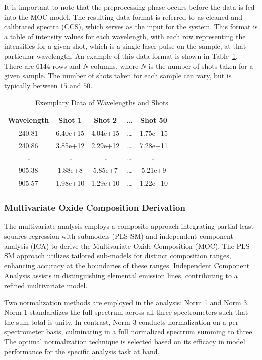 It is important to note that the preprocessing phase occurs before the data is fed into the MOC model.
The resulting data format is referred to as cleaned and calibrated spectra (CCS), which serves as the input for the system.
This format is a table of intensity values for each wavelength, with each row representing the intensities for a given shot, which is a single laser pulse on the sample, at that particular wavelength. An example of this data format is shown in Table~\ref{tab:example_data}. There are $6144$ rows and $N$ columns, where $N$ is the number of shots taken for a given sample. The number of shots taken for each sample can vary, but is typically between $15$ and $50$.

\begin{table}[ht]
\centering
\caption{Exemplary Data of Wavelengths and Shots}
\label{tab:example_data}
\begin{tabular}{|c|c|c|c|c|c|c|c|c|}
\hline
Wavelength & Shot 1   & Shot 2 & \ldots & Shot 50  \\ \hline
240.81     & 6.40e+15 & 4.04e+15 & \ldots& 1.75e+15 \\ \hline
240.86     & 3.85e+12 & 2.29e+12& \ldots & 7.28e+11 \\ \hline
\ldots     & \ldots & \ldots & \ldots & \ldots \\ \hline
905.38     & 1.88e+8 & 5.85e+7 & \ldots & 5.21e+9 \\ \hline
905.57     & 1.98e+10 & 1.29e+10& \ldots & 1.22e+10 \\ \hline
\end{tabular}
\end{table}



\subsubsection{Multivariate Oxide Composition Derivation}\label{sec:moc_derivation}

The multivariate analysis employs a composite approach integrating partial least squares regression with submodels (PLS-SM) and independent component analysis (ICA) to derive the Multivariate Oxide Composition (MOC).
The PLS-SM approach utilizes tailored sub-models for distinct composition ranges, enhancing accuracy at the boundaries of these ranges.
Independent Component Analysis assists in distinguishing elemental emission lines, contributing to a refined multivariate model.

Two normalization methods are employed in the analysis: Norm 1 and Norm 3.
Norm 1 standardizes the full spectrum across all three spectrometers such that the sum total is unity.
In contrast, Norm 3 conducts normalization on a per-spectrometer basis, culminating in a full normalized spectrum summing to three.
The optimal normalization technique is selected based on its efficacy in model performance for the specific analysis task at hand.

